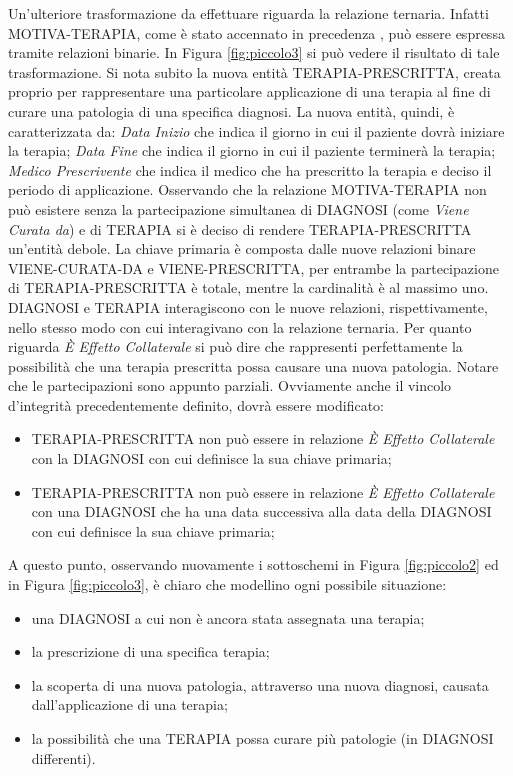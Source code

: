 \documentclass{article}
\begin{document}
Un'ulteriore trasformazione da effettuare riguarda la relazione ternaria.
Infatti MOTIVA-TERAPIA, come è stato accennato in precedenza%
, può essere espressa tramite relazioni binarie.
In Figura \autoref{fig:piccolo3} si può vedere il risultato di tale trasformazione.
Si nota subito la nuova entità TERAPIA-PRESCRITTA, creata proprio per rappresentare una particolare applicazione di una terapia al fine di curare una patologia di una specifica diagnosi.
La nuova entità, quindi, è caratterizzata da:
\textit{Data Inizio} che indica il giorno in cui il paziente dovrà iniziare la terapia;
\textit{Data Fine} che indica il giorno in cui il paziente terminerà la terapia;
\textit{Medico Prescrivente} che indica il medico che ha prescritto la terapia e deciso il periodo di applicazione.
Osservando che la relazione MOTIVA-TERAPIA non può esistere senza la partecipazione simultanea di DIAGNOSI (come \textit{Viene Curata da}) e di TERAPIA si è deciso di rendere TERAPIA-PRESCRITTA un'entità debole.
La chiave primaria è composta dalle nuove relazioni binare VIENE-CURATA-DA e VIENE-PRESCRITTA, per entrambe la partecipazione di TERAPIA-PRESCRITTA è totale, mentre la cardinalità è al massimo uno.%
DIAGNOSI e TERAPIA interagiscono con le nuove relazioni, rispettivamente, nello stesso modo con cui interagivano con la relazione ternaria.
Per quanto riguarda \textit{È Effetto Collaterale} si può dire che rappresenti perfettamente la possibilità che una terapia prescritta possa causare una nuova patologia.
Notare che le partecipazioni sono appunto parziali.
Ovviamente anche il vincolo d'integrità precedentemente definito, dovrà essere modificato:
\begin{itemize}
  \item TERAPIA-PRESCRITTA non può essere in relazione \textit{È Effetto Collaterale} con la DIAGNOSI con cui definisce la sua chiave primaria;
  \item TERAPIA-PRESCRITTA non può essere in relazione \textit{È Effetto Collaterale} con una DIAGNOSI che ha una data successiva alla data della DIAGNOSI con cui definisce la sua chiave primaria;
\end{itemize}
A questo punto, osservando nuovamente i sottoschemi in Figura \autoref{fig:piccolo2} ed in Figura \autoref{fig:piccolo3}, è chiaro che modellino ogni possibile situazione:
\begin{itemize}
  \item una DIAGNOSI a cui non è ancora stata assegnata una terapia;
  \item la prescrizione di una specifica terapia;
  \item la scoperta di una nuova patologia, attraverso una nuova diagnosi, causata dall'applicazione di una terapia;
  \item la possibilità che una TERAPIA possa curare più patologie (in DIAGNOSI differenti).
\end{itemize}
\end{document}
